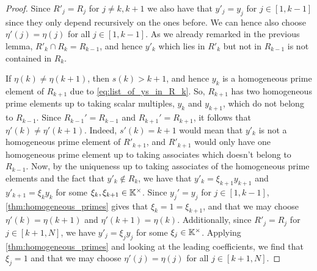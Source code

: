 \begin{proof}
	Since $R'_j = R_j$ for $j\neq k, k+1$ we also have that $y'_j = y_j$ for $j\in [1,
			k-1]$ since they only depend recursively on the ones before. We can hence also choose
	$\eta'(j) = \eta(j)$ for all $j\in [1, k-1]$. As we already remarked in the previous
	lemma, $R'_k \cap R_k = R_{k-1}$, and hence $y'_k$ which lies in $R'_k$ but not in
	$R_{k-1}$ is not contained in $R_k$.

	If $\eta(k) \neq \eta(k+1)$, then $s(k) > k+1$, and hence $y_k$ is a homogeneous prime
	element of $R_{k+1}$ due to \cref{eq:list_of_ys_in_R_k}. So, $R_{k+1}$ has two
	homogeneous prime elements up to taking scalar multiples, $y_k$ and $y_{k+1}$, which do
	not belong to $R_{k-1}$. Since $R_{k-1}' = R_{k-1}$ and $R_{k+1}' = R_{k+1}$, it
	follows that $\eta'(k) \neq \eta'(k+1)$. Indeed, $s'(k) = k+1$ would mean that $y'_k$
	is not a homogeneous prime element of $R'_{k+1}$, and $R'_{k+1}$ would only have one
	homogeneous prime element up to taking associates which doesn't belong to $R_{k-1}$.
	Now, by the uniqueness up to taking associates of the homogeneous prime elements and
	the fact that $y'_k \notin R_k$, we have that $y'_k = \xi_{k+1}y_{k+1}$ and $y'_{k+1} =
		\xi_{k}y_k$ for some $\xi_k, \xi_{k+1} \in \mathbb{K}^\times$. Since $y_j' = y_j$ for $j \in
		[1, k-1]$, \cref{thm:homogeneous_primes} gives that $\xi_{k} = 1 = \xi_{k+1}$, and that
	we may choose $\eta'(k) = \eta(k+1)$ and $\eta'(k+1) = \eta(k)$. Additionally, since
	$R'_j = R_j$ for $j \in [k+1, N]$, we have $y'_j = \xi_j y_j$ for some $\xi_j \in
		\mathbb{K}^\times$. Applying \cref{thm:homogeneous_primes} and looking at the leading
	coefficients, we find that $\xi_j = 1$ and that we may choose $\eta'(j) = \eta(j)$ for
	all $j \in [k+1, N]$. \medskip


\end{proof}
